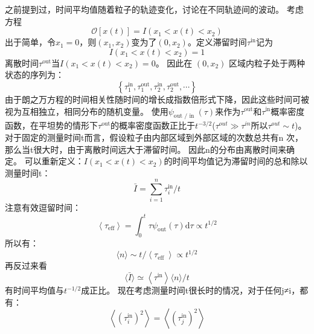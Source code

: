 之前提到过，时间平均值随着粒子的轨迹变化，讨论在不同轨迹间的波动。
考虑方程
\begin{equation}
\mathcal{O}[x(t)]=I\left(x_{1}<x(t)<x_{2}\right)
\end{equation}
出于简单，令$x_{1}=0$，则$\left(x_{1}, x_{2}\right)$变为了$\left(0, x_{2}\right)$。定义滞留时间$\tau^{\mathrm{in}}$记为\begin{equation}
I\left(x_{1}<x(t)<x_{2}\right)=1
\end{equation}
离散时间$\tau^{\mathrm{out}}$当$I\left(x_{1}<x(t)<x_{2}\right)=0$。
因此在
$\left(0, x_{2}\right)$
区域内粒子处于两种状态的序列为：
\begin{equation}
\left\{\tau_{1}^{\mathrm{in}}, \tau_{1}^{\mathrm{out}}, \tau_{2}^{\mathrm{in}}, \tau_{2}^{\mathrm{out}}, \cdots\right\}
\end{equation}
由于朗之万方程的时间相关性随时间的增长成指数倍形式下降，因此这些时间可被视为互相独立，相同分布的随机变量。
使用$\psi_{\text {out } / \text { in }}(\tau)$来作为$\tau^{\mathrm{out}} 和\tau^{\mathrm{in}}$概率密度函数，在平坦势的情形下$\tau^{\mathrm{out}} $的概率密度函数正比于$t^{-3/2}$($\tau^{out}\gg\tau^{in}$所以$\tau^{out}\sim t$)。
对于固定的测量时间t而言，假设粒子由内部区域到外部区域的次数总共有n 次，那么当t很大时，由于离散时间远大于滞留时间。
因此n的分布由离散时间来确定。
可以重新定义：$I\left(x_{1}<x(t)<x_{2}\right)$的时间平均值记为滞留时间的总和除以测量时间t：
\begin{equation}
\bar{I}=\sum_{i=1}^{n} \tau_{i}^{\mathrm{in}} / t
\end{equation}
注意有效逗留时间：
\begin{equation}
\left\langle\tau_{\mathrm{eff}}\right\rangle=\int_{0}^{t} \tau \psi_{\mathrm{out}}(\tau) \mathrm{d} \tau \propto t^{1 / 2}
\end{equation}
所以有：
\begin{equation}\langle n\rangle \sim t /\left\langle\tau_{\text {eff }}\right\rangle \propto t^{1 / 2}
\end{equation}
再反过来看
\begin{equation}
\langle\bar{I}\rangle \simeq\left\langle\tau^{\mathrm{in}}\right\rangle\langle n\rangle / t
\end{equation}
有时间平均值与$t^{-1/2}$成正比。
现在考虑测量时间t很长时的情况，对于任何j≠i，都有：
\begin{equation}
\left\langle\left(\tau_{i}^{\mathrm{in}}\right)^{2}\right\rangle=\left\langle\left(\tau_{j}^{\mathrm{in}}\right)^{2}\right\rangle
\end{equation}
